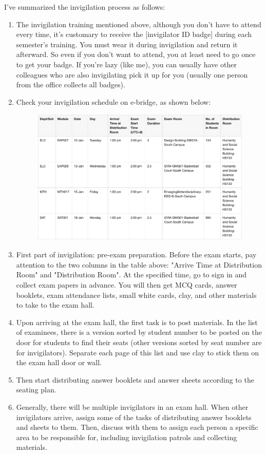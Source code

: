 I've summarized the invigilation process as follows:
\begin{enumerate}
    \item The invigilation training mentioned above, although you don't have to attend every time, it's customary to receive the [invigilator ID badge] during each semester's training. You must wear it during invigilation and return it afterward. So even if you don't want to attend, you at least need to go once to get your badge. If you're lazy (like me), you can usually have other colleagues who are also invigilating pick it up for you (usually one person from the office collects all badges).
    \item Check your invigilation schedule on e-bridge, as shown below:
        \begin{figure}[H]
            \centering
            \includegraphics[width=0.5\columnwidth]{author-folder/Kai.Wu/invigi-table.jpg}
        \end{figure}
    \item First part of invigilation: pre-exam preparation. Before the exam starts, pay attention to the two columns in the table above: "Arrive Time at Distribution Room" and "Distribution Room". At the specified time, go to sign in and collect exam papers in advance. You will then get MCQ cards, answer booklets, exam attendance lists, small white cards, clay, and other materials to take to the exam hall.
    \item Upon arriving at the exam hall, the first task is to post materials. In the list of examinees, there is a version sorted by student number to be posted on the door for students to find their seats (other versions sorted by seat number are for invigilators). Separate each page of this list and use clay to stick them on the exam hall door or wall.
    \item Then start distributing answer booklets and answer sheets according to the seating plan.
    \item Generally, there will be multiple invigilators in an exam hall. When other invigilators arrive, assign some of the tasks of distributing answer booklets and sheets to them. Then, discuss with them to assign each person a specific area to be responsible for, including invigilation patrols and collecting materials.

\end{enumerate}
